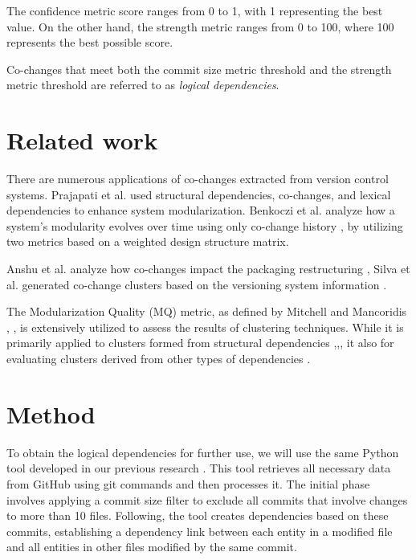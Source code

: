 \documentclass[conference]{IEEEtran}
\begin{document}
The confidence metric score ranges from 0 to 1, with 1 representing the best value. On the other hand, the strength metric ranges from 0 to 100, where 100 represents the best possible score.

Co-changes that meet both the commit size metric threshold and the strength metric threshold are referred to as \textit{logical dependencies}.

\section{Related work}

There are numerous applications of co-changes extracted from version control systems. Prajapati et al. used structural dependencies, co-changes, and lexical dependencies to enhance system modularization. Benkoczi et al. analyze how a system's modularity evolves over time using only co-change history \cite{10.1145/3196398.3196409}, by utilizing two metrics based on a weighted design structure matrix.

Anshu et al. analyze how co-changes impact the packaging restructuring \cite{clusters-cochange}, Silva et al. generated co-change clusters based on the versioning system information \cite{article-cochangem}.


The Modularization Quality (MQ) metric, as defined by Mitchell and Mancoridis \cite{mqmetric}, \cite{mqmetric2}, is extensively utilized to assess the results of clustering techniques. While it is primarily applied to clusters formed from structural dependencies \cite{Bunch1},\cite{Bunch2},\cite{Bunch3}, it also for evaluating clusters derived from other types of dependencies \cite{clustering-ld-lexical}.


\section{Method}
\label{method}

To obtain the logical dependencies for further use, we will use the same Python tool developed in our previous research \cite{articlekeyclass23}. This tool retrieves all necessary data from GitHub \cite{ApacheAntGitHub} using git commands and then processes it. 
The initial phase involves applying a commit size filter to exclude all commits that involve changes to more than 10 files. Following, the tool creates dependencies based on these commits, establishing a dependency link between each entity in a modified file and all entities in other files modified by the same commit. 
\end{document}
